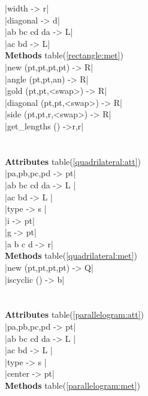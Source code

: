 \documentclass[DIV         = 14,
               fontsize    = 10,
               index       = totoc,
               twoside,
               cadre,
               headings    = small
               ]{tkz-doc}
\begin{document}
\begin{multicols}{3}
|width                     -> r|   \\
|diagonal                  -> d|   \\
|ab bc cd da               -> L|   \\
|ac bd                     -> L|   \\
 \textbf{Methods} table(\ref{rectangle:met}) \\
|new (pt,pt,pt,pt)         -> R|   \\ 
|angle (pt,pt,an)          -> R|   \\
|gold  (pt,pt,<swap>)      -> R|   \\
|diagonal  (pt,pt,<swap>)  -> R|   \\
|side  (pt,pt,r,<swap>)    -> R|   \\
|get_lengths ()            ->r,r|  \\
                                   \\
     \\
 \textbf{Attributes} table(\ref{quadrilateral:att}) \\
|pa,pb,pc,pd               -> pt|  \\
|ab bc cd da               -> L |  \\
|ac bd                     -> L |  \\
|type                      -> s |  \\
|i                         -> pt|  \\
|g                         -> pt|  \\
|a b c d                   -> r|   \\
 \textbf{Methods} table(\ref{quadrilateral:met}) \\
|new (pt,pt,pt,pt)         -> Q|   \\ 
|iscyclic ()               -> b|   \\         
                                   \\
      \\
 \textbf{Attributes} table(\ref{parallelogram:att}) \\
|pa,pb,pc,pd               -> pt|  \\
|ab bc cd da               -> L |  \\
|ac bd                     -> L |  \\
|type                      -> s |  \\
|center                    -> pt|  \\
 \textbf{Methods} table(\ref{parallelogram:met}) \\

\end{multicols}
\end{document}

